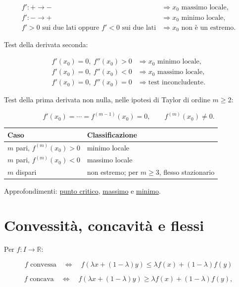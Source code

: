 \[
\begin{aligned}
f':+\to- &\Longrightarrow x_0\text{ massimo locale},\\
f':-\to+ &\Longrightarrow x_0\text{ minimo locale},\\
f'>0\text{ sui due lati oppure }f'<0\text{ sui due lati}
&\Longrightarrow x_0\text{ non è un estremo}.
\end{aligned}
\]

Test della derivata seconda:

\[
\begin{aligned}
f'(x_0)=0,\ f''(x_0)>0
&\Longrightarrow x_0\text{ minimo locale},\\
f'(x_0)=0,\ f''(x_0)<0
&\Longrightarrow x_0\text{ massimo locale},\\
f'(x_0)=0,\ f''(x_0)=0
&\Longrightarrow \text{test inconcludente}.
\end{aligned}
\]

Test della prima derivata non nulla, nelle ipotesi di Taylor di ordine \(m\ge2\):

\[
\displaystyle
f'(x_0)=\cdots=f^{(m-1)}(x_0)=0,
\qquad
f^{(m)}(x_0)\ne0.
\]

\begin{longtable}[]{@{}ll@{}}
\toprule\noalign{}
Caso & Classificazione \\
\midrule\noalign{}
\endhead
\bottomrule\noalign{}
\endlastfoot
\(m\) pari, \(f^{(m)}(x_0)>0\) & minimo locale \\
\(m\) pari, \(f^{(m)}(x_0)<0\) & massimo locale \\
\(m\) dispari & non estremo; per \(m\ge3\), flesso stazionario \\
\end{longtable}

Approfondimenti: \href{https://ingegnerismo.it/matematica/punto-critico/}{punto critico}, \href{https://ingegnerismo.it/matematica/massimo/}{massimo} e \href{https://ingegnerismo.it/matematica/minimo/}{minimo}.

\section{Convessità, concavità e flessi}\label{convessituxe0-concavituxe0-e-flessi}

Per \(f:I\to\mathbb R\):

\[
\displaystyle
f\text{ convessa}
\quad\Longleftrightarrow\quad
f(\lambda x+(1-\lambda)y)
\le
\lambda f(x)+(1-\lambda)f(y)
\]

\[
\displaystyle
f\text{ concava}
\quad\Longleftrightarrow\quad
f(\lambda x+(1-\lambda)y)
\ge
\lambda f(x)+(1-\lambda)f(y),
\]


